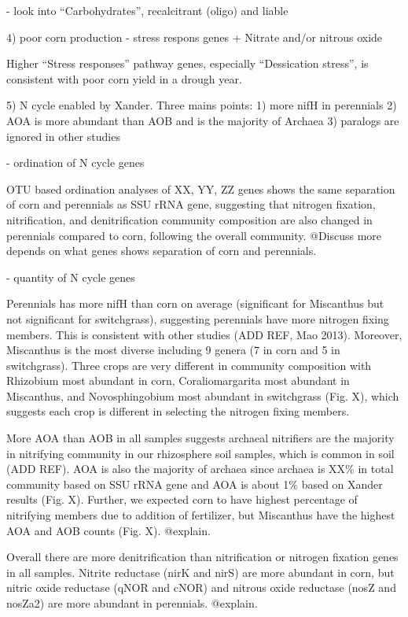 \documentclass[12pt]{article}
\begin{document}
- look into ``Carbohydrates'', recalcitrant (oligo) and liable

4) poor corn production - stress respons genes + Nitrate and/or nitrous oxide

Higher ``Stress responses'' pathway genes, especially ``Dessication stress'', is consistent with poor corn yield in a drough year.

5) N cycle enabled by Xander. Three mains points: 1) more nifH in perennials 2) AOA is more abundant than AOB and is the majority of Archaea 3) paralogs are ignored in other studies

- ordination of N cycle genes

OTU based ordination analyses of XX, YY, ZZ genes shows the same separation of corn and perennials as SSU rRNA gene, suggesting that nitrogen fixation, nitrification, and denitrification community composition are also changed in perennials compared to corn, following the overall community. @Discuss more depends on what genes shows separation of corn and perennials.

- quantity of N cycle genes

Perennials has more nifH than corn on average (significant for Miscanthus but not significant for switchgrass), suggesting perennials have more nitrogen fixing members. This is consistent with other studies (ADD REF, Mao 2013). Moreover, Miscanthus is the most diverse including 9 genera (7 in corn and 5 in switchgrass). Three crops are very different in community composition with Rhizobium most abundant in corn, Coraliomargarita most abundant in Miscanthus, and Novosphingobium most abundant in switchgrass (Fig. X), which suggests each crop is different in selecting the nitrogen fixing members.

More AOA than AOB in all samples suggests archaeal nitrifiers are the majority in nitrifying community in our rhizosphere soil samples, which is common in soil (ADD REF). AOA is also the majority of archaea since archaea is XX\% in total community based on SSU rRNA gene and AOA is about 1\% based on Xander results (Fig. X). Further, we expected corn to have highest percentage of nitrifying members due to addition of fertilizer, but Miscanthus have the highest AOA and AOB counts (Fig. X). @explain.

Overall there are more denitrification than nitrification or nitrogen fixation genes in all samples. Nitrite reductase (nirK and nirS) are more abundant in corn, but nitric oxide reductase (qNOR and cNOR) and nitrous oxide reductase (nosZ and nosZa2) are more abundant in perennials. @explain. 
\end{document}
